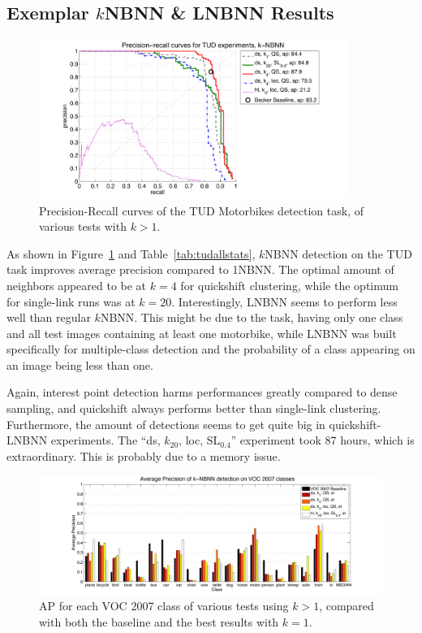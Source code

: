 
\subsection{Exemplar $k$NBNN \& LNBNN Results} %
\label{ssub:lnbnn_results}

\begin{figure}[hbt]
    \centering
    \includegraphics[width=0.9\textwidth]{TUDklocprc}
    \caption{Precision-Recall curves of the TUD Motorbikes detection task, of various tests with $k>1$.}
    \label{fig:tudklocprc}
\end{figure}



As shown in Figure~\ref{fig:tudklocprc} and Table~\ref{tab:tudallstats}, $k$NBNN detection on the TUD task improves average precision compared to 1NBNN. The optimal amount of neighbors appeared to be at $k=4$ for quickshift clustering, while the optimum for single-link runs was at $k=20$. Interestingly, LNBNN seems to perform less well than regular $k$NBNN. This might be due to the task, having only one class and all test images containing at least one motorbike, while LNBNN was built specifically for multiple-class detection and the probability of a class appearing on an image being less than one.

Again, interest point detection harms performances greatly compared to dense sampling, and quickshift always performs better than single-link clustering. Furthermore, the amount of detections seems to get quite big in quickshift-LNBNN experiments. The ``ds, $k_{20}$, loc, SL$_{0.4}$'' experiment took 87 hours, which is extraordinary. This is probably due to a memory issue.

\begin{figure}[hbt]
    \centering
    \includegraphics[width=\textwidth]{VOCklocap}
    \caption{AP for each VOC 2007 class of various tests using $k>1$, compared with both the baseline and the best results with $k=1$.}
    \label{fig:vocklocap}
\end{figure}

